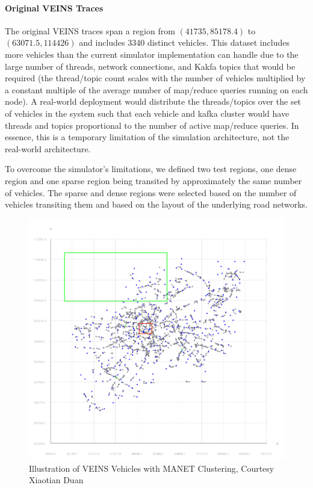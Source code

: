 \documentclass{thesis}
\begin{document}
    \paragraph{Original VEINS Traces}
        The original VEINS traces span a region from $(41735, 85178.4)$ to $(63071.5, 114426)$ and includes 3340 distinct
        vehicles. This dataset includes more vehicles than the current simulator implementation can handle due to the large
        number of threads, network connections, and Kakfa topics that would be required (the thread/topic count scales with the
        number of vehicles multiplied by a constant multiple of the average number of map/reduce queries running on each node).
        A real-world deployment would distribute the threads/topics over the set of vehicles in the system such that each
        vehicle and kafka cluster would have threads and topics proportional to the number of active map/reduce queries.
        In essence, this is a temporary limitation of the simulation architecture, not the real-world architecture.

        To overcome the simulator's limitations, we defined two test regions, one dense region and one sparse region
        being transited by approximately the same number of vehicles. The sparse and dense regions were selected based
        on the number of vehicles transiting them and based on the layout of the underlying road networks.

    \begin{figure}
        \centering
        \includegraphics[scale=.5]{binImages/sparse-and-dense-clusters.png}
        \caption{Illustration of VEINS Vehicles with MANET Clustering, Courtesy Xiaotian Duan}
        \label{fig:regions}
    \end{figure}
\end{document}
